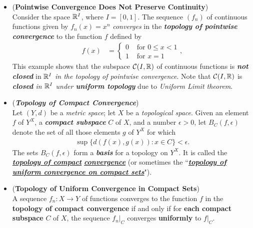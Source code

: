 \documentclass[11pt]{article}
\begin{document}
\begin{itemize}
\item \begin{example} (\textbf{Pointwise Convergence Does Not Preserve Continuity})\\
Consider the space ${\mathbb R}^I$, where $I = [0, 1]$. The sequence $(f_n)$ of continuous functions given by $f_n(x) = x^n$ \emph{converges} in the \emph{\textbf{topology of pointwise convergence}} to the function $f$ defined by
\begin{align*}
f(x) &=\left\{ 
\begin{array}{cc}
0 &\text{ for } 0 \le x < 1\\
1 &\text{ for } x = 1
\end{array}\right.,
\end{align*}
This example shows that the subspace ${\mathcal C}(I, {\mathbb R})$ of continuous functions is \emph{\textbf{not closed}} in ${\mathbb R}^I$
\emph{in the topology of pointwise convergence}. Note that ${\mathcal C}(I, {\mathbb R})$  is \emph{\textbf{closed} in ${\mathbb R}^I$ under \textbf{uniform topology}} due to \emph{Uniform Limit theorem}. 
\end{example}

\item \begin{definition} (\emph{\textbf{Topology of Compact Convergence}})\\
Let $(Y, d)$ be a \emph{metric space}; let $X$ be a \emph{topological space}. Given an element $f$ of $Y^X$, a \emph{\textbf{compact subspace}} $C$ of $X$, and a number $\epsilon > 0$, let $B_{C}(f, \epsilon)$ denote the set of all those elements $g$ of $Y^X$ for which
\begin{align*}
\sup\{d(f (x), g(x)): x \in C\} < \epsilon.
\end{align*}
The sets $B_{C}(f, \epsilon)$  form a \emph{\textbf{basis}} for a topology on $Y^X$. It is called the \underline{\emph{\textbf{topology of compact}}} \underline{\emph{\textbf{convergence}}} (or sometimes the ``\underline{\emph{\textbf{topology of uniform convergence on compact sets}}}").
\end{definition}

\item \begin{proposition} (\textbf{Topology of Uniform Convergence in Compact Sets}) \citep{munkres2000topology}\\
A sequence $f_n : X \rightarrow Y$ of functions converges to the function $f$ in the \textbf{topology of compact convergence} if and only if for \textbf{each compact subspace} $C$ of $X$, the sequence $f_n|_{C}$ converges \textbf{uniformly} to $f|_C$.
\end{proposition}


\end{itemize}
\end{document}
